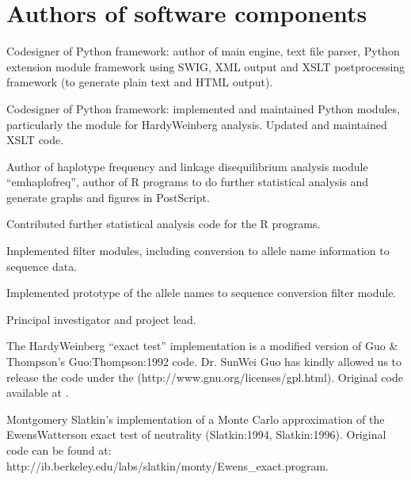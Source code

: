 \documentclass[letterpaper,10pt,english,openany,oneside]{sphinxmanual}
\begin{document}
\section{Authors of software components}
\label{\detokenize{docs/guide-chapter-changes:authors-of-software-components}}\label{\detokenize{docs/guide-chapter-changes:guide-preface-authors}}\begin{description}
\sphinxAtStartPar
Co\sphinxhyphen{}designer of Python framework: author of main engine, text file
parser, Python extension module framework using SWIG, XML output and
XSLT post\sphinxhyphen{}processing framework (to generate plain text and HTML
output).

\sphinxAtStartPar
Co\sphinxhyphen{}designer of Python framework: implemented and maintained Python
modules, particularly the module for Hardy\sphinxhyphen{}Weinberg analysis. Updated
and maintained XSLT code.

\sphinxAtStartPar
Author of haplotype frequency and linkage disequilibrium analysis
module “emhaplofreq”, author of R programs to do further statistical
analysis and generate graphs and figures in PostScript.

\sphinxAtStartPar
Contributed further statistical analysis code for the R programs.

\sphinxAtStartPar
Implemented filter modules, including conversion to allele name
information to sequence data.

\sphinxAtStartPar
Implemented prototype of the allele names to sequence conversion
filter module.

\sphinxAtStartPar
Principal investigator and project lead.

\sphinxAtStartPar
The Hardy\sphinxhyphen{}Weinberg “exact test” implementation is a modified version
of Guo \& Thompson’s Guo:Thompson:1992 code. Dr. Sun\sphinxhyphen{}Wei Guo has
kindly allowed us to release the code under the  (http://www.gnu.org/licenses/gpl.html). Original code
available at
.

\sphinxAtStartPar
Montgomery Slatkin’s implementation of a Monte Carlo approximation of
the Ewens\sphinxhyphen{}Watterson exact test of neutrality (Slatkin:1994,
Slatkin:1996). Original code can be found at:
http://ib.berkeley.edu/labs/slatkin/monty/Ewens\_exact.program.


\end{description}
\end{document}
